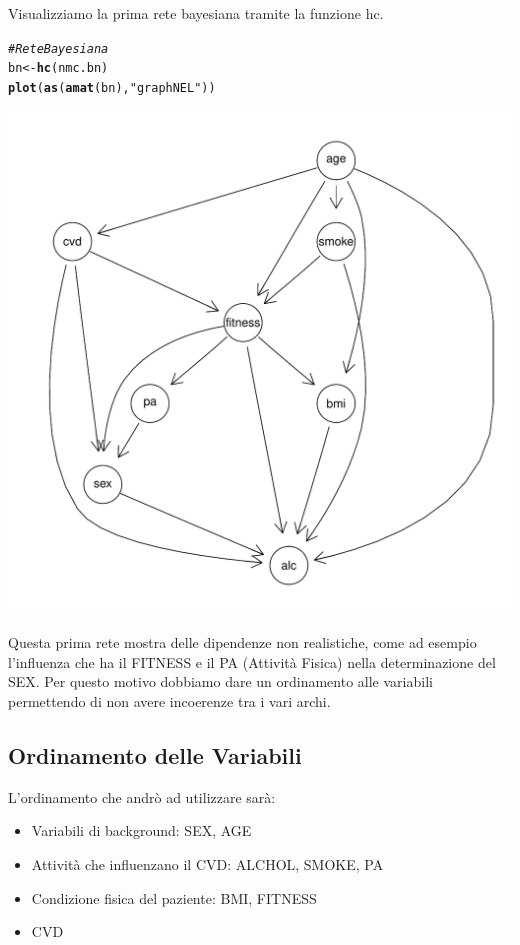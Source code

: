 \documentclass{article}\usepackage[]{graphicx}\usepackage[]{xcolor}
\makeatletter
\def\maxwidth{ %
  \ifdim\Gin@nat@width>\linewidth
    \linewidth
  \else
    \Gin@nat@width
  \fi
}
\newcommand{\hlstr}[1]{\textcolor[rgb]{0.192,0.494,0.8}{#1}}%
\newcommand{\hlcom}[1]{\textcolor[rgb]{0.678,0.584,0.686}{\textit{#1}}}%
\newcommand{\hlstd}[1]{\textcolor[rgb]{0.345,0.345,0.345}{#1}}%
\newcommand{\hlkwb}[1]{\textcolor[rgb]{0.69,0.353,0.396}{#1}}%
\newcommand{\hlkwd}[1]{\textcolor[rgb]{0.737,0.353,0.396}{\textbf{#1}}}%
\newenvironment{kframe}{%
 \def\at@end@of@kframe{}%
 \ifinner\ifhmode%
  \def\at@end@of@kframe{\end{minipage}}%
  \begin{minipage}{\columnwidth}%
 \fi\fi%
 \def\FrameCommand##1{\hskip\@totalleftmargin \hskip-\fboxsep
 \colorbox{shadecolor}{##1}\hskip-\fboxsep
     \hskip-\linewidth \hskip-\@totalleftmargin \hskip\columnwidth}%
 \MakeFramed {\advance\hsize-\width
   \@totalleftmargin\z@ \linewidth\hsize
   \@setminipage}}%
 {\par\unskip\endMakeFramed%
 \at@end@of@kframe}
\newenvironment{knitrout}{}{} %
\makeatother
\begin{document}
    Visualizziamo la prima rete bayesiana tramite la funzione hc. 
\begin{knitrout}
\color{fgcolor}\begin{kframe}
\begin{alltt}
\hlcom{#Rete Bayesiana}
\hlstd{bn} \hlkwb{<-} \hlkwd{hc}\hlstd{(nmc.bn)}
\hlkwd{plot}\hlstd{(}\hlkwd{as}\hlstd{(}\hlkwd{amat}\hlstd{(bn),} \hlstr{"graphNEL"}\hlstd{))}
\end{alltt}
\end{kframe}
\includegraphics[width=\maxwidth]{figure/Rete_Bayesiana-1} 
\end{knitrout}
    
    Questa prima rete mostra delle dipendenze non realistiche, come ad esempio
    l'influenza che ha il FITNESS e il PA (Attività Fisica) nella determinazione
    del SEX. Per questo motivo dobbiamo dare un ordinamento alle variabili
    permettendo di non avere incoerenze tra i vari archi.
    
    \subsection{Ordinamento delle Variabili}
      L'ordinamento che andrò ad utilizzare sarà:
      \begin{itemize}
        \item Variabili di background: SEX, AGE
        \item Attività che influenzano il CVD: ALCHOL, SMOKE, PA
        \item Condizione fisica del paziente: BMI, FITNESS
        \item CVD
      \end{itemize}
      
\end{document}
